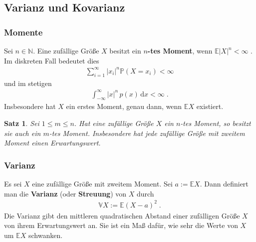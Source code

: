 \documentclass[ngerman,draft,parskip=half,twoside]{scrartcl}
\newtheorem{thm}{Satz}[section]
\newcommand*{\N}{\mathbb{N}}      %
\newcommand*{\E}{\mathbb{E}}        %
\newcommand*{\V}{\mathbb{V}}        %
\newcommand*{\WKM}{\mathbb{P}}      %
\begin{document}
\subsection{Varianz und Kovarianz}
\subsubsection{Momente}
Sei $n\in\N$. Eine zufällige Größe $X$ besitzt ein \textbf{$n$-tes Moment}, wenn
$\E|X|^n<\infty$ . Im diskreten Fall bedeutet dies
\begin{gather*}
  \sum_{i=1}^\infty |x_i|^n\WKM(X=x_i)<\infty
\end{gather*}
und im stetigen
\begin{gather*}
  \int_{-\infty}^\infty |x|^n\,p(x)\,\mathrm d x<\infty\;.
\end{gather*}
Insbesondere hat $X$ ein erstes Moment, genau dann, wenn $\E X$ existiert.
\begin{thm}
Sei $1\le m\le n$. Hat eine zufällige Größe $X$ ein $n$-tes Moment, so besitzt sie auch ein $m$-tes Moment.
Insbesondere hat jede zufällige Größe mit zweitem Moment einen Erwartungswert.
\end{thm}
\subsubsection{Varianz}
Es sei $X$ eine zufällige Größe mit zweitem Moment. Sei $a:=\E X$. Dann definiert man
die \textbf{Varianz} (oder \textbf{Streuung}) von $X$ durch
\begin{gather*}
  \V X:= \E(X-a)^2\;.
\end{gather*}
Die Varianz gibt den mittleren quadratischen Abstand einer zufälligen Größe $X$ von ihrem
Erwartungswert an. Sie ist ein Maß dafür, wie sehr die Werte von $X$ um $\E X$ schwanken.
\end{document}
